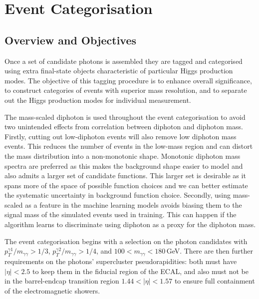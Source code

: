 \chapter{Event Categorisation}
\label{chap:event_select}

\section{Overview and Objectives}
Once a set of candidate photons is assembled they are tagged and categorised using extra final-state objects characteristic of particular Higgs production modes.
The objective of this tagging procedure is to enhance overall significance, to construct categories of events with superior mass resolution, and to separate out the Higgs production modes for individual measurement. 


The mass-scaled diphoton \pt is used throughout the event categorisation to avoid two unintended effects from correlation between diphoton \pt and diphoton mass. 
Firstly, cutting out low-\pt diphoton events will also remove low diphoton mass events. 
This reduces the number of events in the low-mass region and can distort the mass distribution into a non-monotonic shape.
Monotonic diphoton mass spectra are preferred as this makes the background shape easier to model and also admits a larger set of candidate functions. 
This larger set is desirable as it spans more of the space of possible function choices and we can better estimate the systematic uncertainty in background function choice. 
Secondly, using mass-scaled \pt as a feature in the machine learning models avoids biasing them to the signal mass of the simulated events used in training.
This can happen if the algorithm learns to discriminate using diphoton \pt as a proxy for the diphoton mass.

The event categorisation begins with a selection on the photon candidates with $p_{T}^{\gamma1}/m_{\gamma\gamma} > 1/3$, $p_{T}^{\gamma2}/m_{\gamma\gamma} > 1/4$, and $100 < m_{\gamma\gamma} < 180$\,GeV.
There are then further requirements on the photons' supercluster pseudorapidities: both must have $|\eta| < 2.5$ to keep them in the fiducial region of the ECAL, and also must not be in the barrel-endcap transition region $1.44 < |\eta| < 1.57$ to ensure full containment of the electromagnetic showers. 


